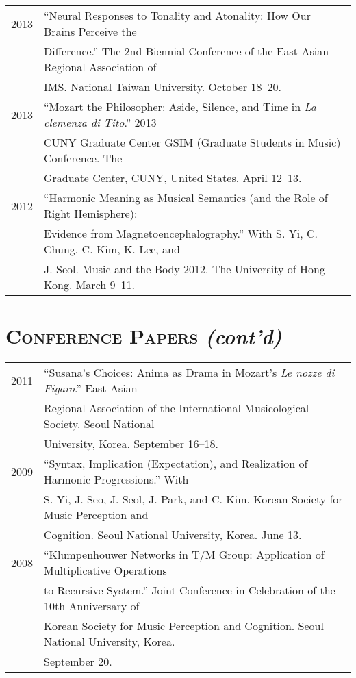 \documentclass[letter,11pt]{article}
\begin{document}
\begin{tabular}{p{2.5cm} p{12.5cm}}
  2013 & “Neural Responses to Tonality and Atonality: How Our Brains Perceive the\\
  & Difference.” The 2nd Biennial Conference of the East Asian Regional Association of\\
  & IMS. National Taiwan University. October 18–20.\\[2mm]

  2013 & “Mozart the Philosopher: Aside, Silence, and Time in \textit{La clemenza di Tito}.” 2013\\
  & CUNY Graduate Center GSIM (Graduate Students in Music) Conference. The\\
  & Graduate Center, CUNY, United States. April 12–13.\\[2mm]

  2012 & “Harmonic Meaning as Musical Semantics (and the Role of Right Hemisphere):\\
  & Evidence from Magnetoencephalography.” With S. Yi, C. Chung, C. Kim, K. Lee, and\\
  & J. Seol. Music and the Body 2012. The University of Hong Kong. March 9–11.
  \end{tabular}
  
  \section*{\textsc{Conference Papers} \textit{(cont'd)}}
  
  \hspace*{-0.25cm}
  \begin{tabular}{p{2.5cm} p{12.5cm}}
  2011 & “Susana’s Choices: Anima as Drama in Mozart’s \textit{Le nozze di Figaro}.” East Asian\\
  & Regional Association of the International Musicological Society. Seoul National\\
  & University, Korea. September 16–18.\\[2mm]

  2009 & “Syntax, Implication (Expectation), and Realization of Harmonic Progressions.” With\\
  & S. Yi, J. Seo, J. Seol, J. Park, and C. Kim. Korean Society for Music Perception and\\
  & Cognition. Seoul National University, Korea. June 13.\\[2mm]
  
  2008 & “Klumpenhouwer Networks in T/M Group: Application of Multiplicative Operations\\
  & to Recursive System.” Joint Conference in Celebration of the 10th Anniversary of\\
  & Korean Society for Music Perception and Cognition. Seoul National University, Korea.\\
  & September 20.
  \end{tabular}
  
\end{document}
